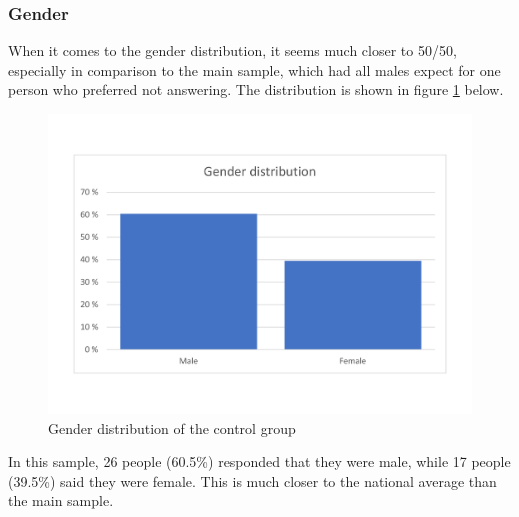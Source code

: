 \subsubsection{Gender}
When it comes to the gender distribution, it seems much closer to 50/50, especially in comparison to the main sample, which had all males expect for one person who preferred not answering. The distribution is shown in figure \ref{fig:gender_controlgroup} below. 
\begin{figure}[!h]
    \centering
    \includegraphics[scale=0.40]{figures/diagrams/gender_controlgroup.pdf}
    \caption{Gender distribution of the control group}
    \label{fig:gender_controlgroup}
\end{figure}
In this sample, 26 people (60.5\%) responded that they were male, while 17 people (39.5\%) said they were female. This is much closer to the national average than the main sample. 

